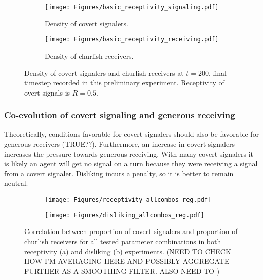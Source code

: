 \documentclass[11pt,letterpaper]{article}
\begin{document}
\begin{figure}[H]
  \centering
  \begin{subfigure}{0.49\textwidth}
    \centering
    \texttt{[image: Figures/basic\_receptivity\_signaling.pdf]}
    \caption{Density of covert signalers.}
  \end{subfigure}
  \begin{subfigure}{0.49\textwidth}
    \centering
    \texttt{[image: Figures/basic\_receptivity\_receiving.pdf]}
    \caption{Density of churlish receivers.}
  \end{subfigure}
  
  \caption{Density of covert signalers and churlish receivers at $t=200$, 
    final timestep recorded in this preliminary experiment. Receptivity of
    overt signals is $R=0.5$.}
  \label{fig:receptivityHomophilyHeatmap}
\end{figure}

\subsubsection{Co-evolution of covert signaling and generous receiving}

Theoretically, conditions favorable for covert
signalers should also be favorable for generous receivers (TRUE??). Furthermore, 
an increase in covert signalers increases the pressure towards generous receiving.
With many covert signalers it is likely an agent will get no signal on a 
turn because they were receiving a signal from a covert signaler. Disliking
incurs a penalty, so it is better to remain neutral.

\begin{figure}[H]
  \centering
  \begin{subfigure}{0.49\textwidth}
    \centering
    \texttt{[image: Figures/receptivity\_allcombos\_reg.pdf]}
    \caption{}
    \label{fig:}
  \end{subfigure}
  \begin{subfigure}{0.49\textwidth}
    \centering
    \texttt{[image: Figures/disliking\_allcombos\_reg.pdf]}
    \caption{}
    \label{fig:}
  \end{subfigure}
  \caption{Correlation between proportion of covert signalers and proportion of
    churlish receivers for all tested parameter combinations in both 
    receptivity (a) and disliking (b) experiments. (NEED TO CHECK HOW I'M AVERAGING
    HERE AND POSSIBLY AGGREGATE FURTHER AS A SMOOTHING FILTER. ALSO NEED TO
    )}
  \label{fig:regressions}
\end{figure}
\end{document}
